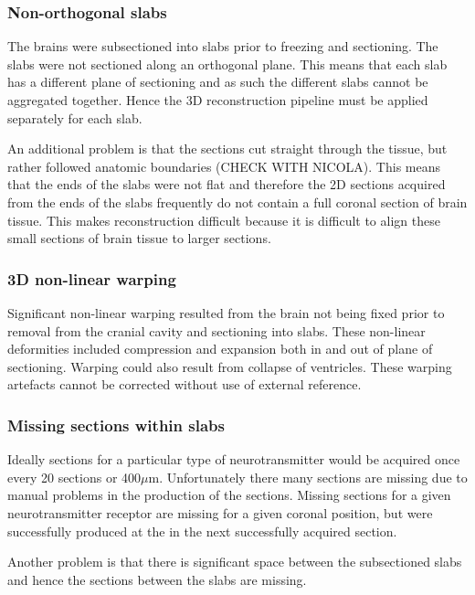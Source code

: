 \documentclass[12pt]{article}
\begin{document}
\subsubsection{Non-orthogonal slabs}

The brains were subsectioned into slabs prior to freezing and sectioning. The slabs were not sectioned along an orthogonal plane. This means that each slab has a different plane of sectioning and as such the different slabs cannot be aggregated together. Hence the 3D reconstruction pipeline must be applied separately for each slab. 

An additional problem is that the sections cut straight through the tissue, but rather followed anatomic boundaries (CHECK WITH NICOLA). This means that the ends of the slabs were not flat and therefore the 2D sections acquired from the ends of the slabs frequently do not contain a full coronal section of brain tissue. This makes reconstruction difficult because it is difficult to align these small sections of brain tissue to larger sections. 

\subsubsection{3D non-linear warping}

Significant non-linear warping resulted from the brain not being fixed prior to removal from the cranial cavity and sectioning into slabs. These non-linear deformities included compression and expansion both in and out of plane of sectioning. Warping could also result from collapse of ventricles. These warping artefacts cannot be corrected without use of external reference. 

\subsubsection{Missing sections within slabs}

Ideally sections for a particular type of neurotransmitter would be acquired once every 20 sections or 400$\mu$m. Unfortunately there many sections are missing due to manual problems in the production of the sections. Missing sections for a given neurotransmitter receptor are missing for a given coronal position, but were successfully produced at the in the next successfully acquired section.

Another problem is that there is significant space between the subsectioned slabs and hence the sections between the slabs are missing.
\end{document}
